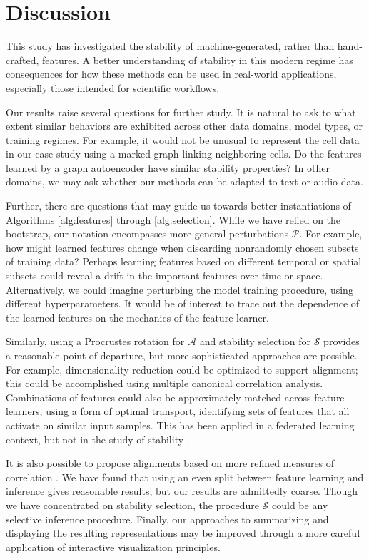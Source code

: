 
\section{Discussion}

This study has investigated the stability of machine-generated, rather than
hand-crafted, features. A better understanding of stability in this modern
regime has consequences for how these methods can be used in real-world
applications, especially those intended for scientific workflows.

Our results raise several questions for further study. It is natural to ask
to what extent similar behaviors are exhibited across other data domains, model
types, or training regimes. For example, it would not be unusual to represent
the cell data in our case study using a marked graph linking neighboring cells.
Do the features learned by a graph autoencoder have similar stability
properties? In other domains, we may ask whether our methods can be adapted to
text or audio data.

Further, there are questions that may guide us towards better instantiations of
Algorithms \ref{alg:features} through \ref{alg:selection}. While we have relied
on the bootstrap, our notation encompasses more general perturbations
$\mathcal{P}$. For example, how might learned features change when discarding
nonrandomly chosen subsets of training data? Perhaps learning features based on
different temporal or spatial subsets could reveal a drift in the important
features over time or space. Alternatively, we could imagine perturbing the
model training procedure, using different hyperparameters. It would be of
interest to trace out the dependence of the learned features on the mechanics of
the feature learner.

Similarly, using a Procrustes rotation for $\mathcal{A}$ and stability selection
for $\mathcal{S}$ provides a reasonable point of departure, but more
sophisticated approaches are possible. For example, dimensionality reduction
could be optimized to support alignment; this could be accomplished using
multiple canonical correlation analysis. Combinations of features could also be
approximately matched across feature learners, using a form of optimal
transport, identifying sets of features that all activate on similar input
samples. This has been applied in a federated learning context, but not in the
study of stability \citep{wang2020federated}.

It is also possible to propose alignments based on more refined measures of
correlation \citep{josse2016measuring, azadkia2019simple}. We have found that
using an even split between feature learning and inference gives reasonable
results, but our results are admittedly coarse. Though we have concentrated on
stability selection, the procedure $\mathcal{S}$ could be any selective
inference procedure. Finally, our approaches to summarizing and displaying the
resulting representations may be improved through a more careful application of
interactive visualization principles.

